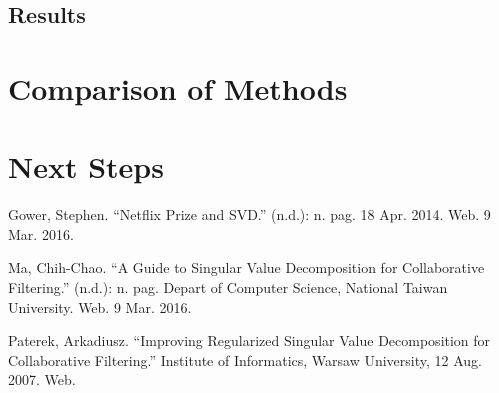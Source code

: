 \documentclass[12pt]{article}
\begin{document}
\subsection{Results}

\section{Comparison of Methods}

\section{Next Steps}

\begin{thebibliography}{9}

Gower, Stephen. ``Netflix Prize and SVD.'' (n.d.): n. pag. 18 Apr. 2014. Web. 9 Mar. 2016.

Ma, Chih-Chao. ``A Guide to Singular Value Decomposition for Collaborative Filtering.'' (n.d.): n. pag. Depart of Computer Science, National Taiwan University. Web. 9 Mar. 2016.

Paterek, Arkadiusz. ``Improving Regularized Singular Value Decomposition for Collaborative Filtering.'' Institute of Informatics, Warsaw University, 12 Aug. 2007. Web.

\end{thebibliography}
\end{document}
